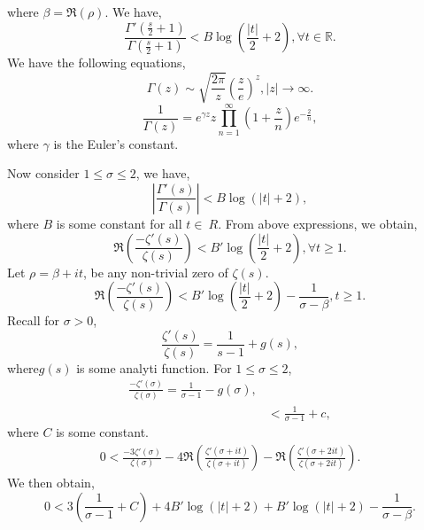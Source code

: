\documentclass{article}
\newcommand{\R}[0]{\mathbb{R}}
\begin{document}
where $\beta=\Re(\rho)$. We have,
\begin{equation*}
  {\frac {\Gamma'\left({\frac s 2}+1\right)} {\Gamma\left({\frac s 2}+1\right)}}<B\log\left({\frac {\vert t\vert} 2}+2\right),\forall t\in\R.
\end{equation*}
We have the following equations,
\begin{equation*}
  \Gamma(z)\sim\sqrt{{\frac {2\pi} z}}\left({\frac z e}\right)^z,\vert z\vert\to\infty.
\end{equation*}
\begin{equation*}
  {\frac 1 {\Gamma(z)}} = e^{\gamma z}z\prod_{n=1}^\infty \left(1+{\frac z n}\right)e^{-{\frac 2 n}},
\end{equation*}
where $\gamma$ is the Euler's constant.
\par Now consider $1\leq \sigma\leq 2$, we have,
\begin{equation*}
  \left\vert{\frac {\Gamma'(s)} {\Gamma(s)}}\right\vert<B\log(\vert t\vert+2),
\end{equation*}
where $B$ is some constant for all $t\in\ R$.
From above expressions, we obtain,
\begin{equation*}
  \Re\left({\frac {-\zeta'(s)} {\zeta(s)}}\right)<B'\log\left({\frac {\vert t\vert} {2}+2}\right),\forall t\geq1.
\end{equation*}
Let $\rho=\beta+it$, be any non-trivial zero of $\zeta(s)$.
\begin{equation*}
  \Re\left({\frac {-\zeta'(s)} {\zeta(s)}}\right)<B'\log\left({\frac {\vert t\vert} 2}+2\right)-{\frac 1 {\sigma-\beta}}, t\geq1.
\end{equation*}
Recall for $\sigma>0$, 
\begin{equation*}
  {\frac {\zeta'(s)} {\zeta(s)}} = {\frac 1 {s-1}}+g(s),
\end{equation*}
where$g(s)$ is some analyti function. For $1\leq\sigma\leq 2$, 
\begin{align*}
  {\frac {-\zeta'(\sigma)} {\zeta(\sigma)}} = {\frac 1 {\sigma-1}}-g(\sigma),\\
  &<{\frac 1 {\sigma-1}}+c,
\end{align*}
where $C$ is some constant.
\begin{align*}
  0<{\frac {-3\zeta'(\sigma)} {\zeta(\sigma)}}-4\Re\left({\frac {\zeta'(\sigma+it)} {\zeta(\sigma+it)}}\right)-\Re\left({\frac {\zeta'(\sigma+2it)} {\zeta(\sigma+2it)}}\right).
\end{align*}
We then obtain,
\begin{equation*}
  0<3\left({\frac 1 {\sigma-1}}+C\right)+4B'\log(\vert t\vert+2)+B'\log(\vert t\vert+2)-{\frac 1{\sigma-\beta}}.
\end{equation*}
\end{document}
